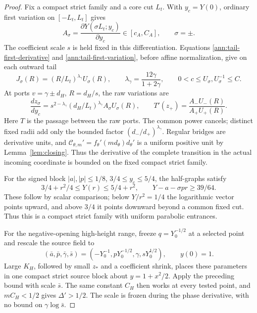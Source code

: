 \begin{proof}
Fix a compact strict family and a core cut \(L_t\). With
\(y_c=Y(0)\), ordinary first variation on \([-L_t,L_t]\) gives
\[
 A_\sigma=\frac{\partial Y(\sigma L_t;y_c)}{\partial y_c}
 \in[c_A,C_A],\qquad \sigma=\pm.
\]
The coefficient scale \(s\) is held fixed in this differentiation.
Equations \eqref{ann:tail-first-derivative} and
\eqref{ann:tail-first-variation}, before affine normalization, give on
each outward tail
\[
 J_\sigma(R)=(R/L_t)^{\lambda_\gamma}U_\sigma(R),\qquad
 \lambda_\gamma=\frac{12\gamma}{1+2\gamma},\qquad
 0<c\le U_\sigma,U_\sigma^{-1}\le C.
\]
At ports \(v=\gamma\pm d_H\), \(R=d_H/s\), the raw variations are
\begin{equation}\label{sharp:upper-tail-ratio}
 \frac{dz_\sigma}{dy_c}
 =s^{2-\lambda_\gamma}(d_H/L_t)^{\lambda_\gamma}
                                      A_\sigma U_\sigma(R),\qquad
 T'(z_+)=\frac{A_-U_-(R)}{A_+U_+(R)}.
\end{equation}
Here \(T\) is the passage between the raw ports. The common power
cancels; distinct fixed radii add only the bounded factor
\((d_-/d_+)^{\lambda_\gamma}\). Regular bridges are derivative units, and
\(\mathcal C_{\theta,m}'=f_\theta'(md_\theta)d_\theta'\) is a
uniform positive unit by Lemma~\ref{lem:closing}. Thus the derivative
of the complete transition in the actual incoming coordinate is
bounded on the fixed compact strict family.

For the signed block \(|a|,|p|\le1/8\),
\(3/4\le y_c\le5/4\), the half-graphs satisfy
\[
 3/4+r^2/4\le Y(r)\le5/4+r^2,\qquad
 Y-a-\sigma pr\ge39/64.
\]
These follow by scalar comparison; below \(Y/r^2=1/4\) the
logarithmic vector points upward, and above \(3/4\) it points
downward beyond a common fixed cut. Thus this is a compact strict
family with uniform parabolic entrances.

For the negative-opening high-height range, freeze
\(q=Y_0^{-1/2}\) at a selected point and rescale the source field to
\[
 (\bar a,\bar p,\bar\gamma,\bar s)
   =(-Y_0^{-1},pY_0^{-1/2},\gamma,sY_0^{1/2}),\qquad y(0)=1.
\]
Large \(K_H\), followed by small \(z_*\) and a coefficient shrink,
places these parameters in one compact strict source block about
\(y=1+x^2/2\). Apply the preceding bound with scale \(\bar s\).
The same constant \(C_H\) then works at every tested point, and
\(mC_H<1/2\) gives \(\Delta'>1/2\).
The scale is frozen during the phase derivative, with no bound on
\(\gamma\log\bar s\).
\end{proof}

